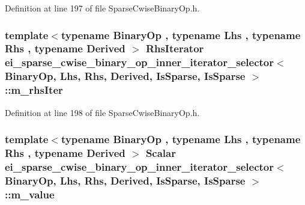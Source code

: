 Definition at line 197 of file Sparse\-Cwise\-Binary\-Op.\-h.

\hypertarget{classei__sparse__cwise__binary__op__inner__iterator__selector_3_01_binary_op_00_01_lhs_00_01_rhs41884b18ee8e06a3d784c3c098ec6b91_a04c14eedbcb446aadbc695ba362b4578}{
\subsubsection[{m\-\_\-rhs\-Iter}]{\setlength{\rightskip}{0pt plus 5cm}template$<$typename Binary\-Op , typename Lhs , typename Rhs , typename Derived $>$ Rhs\-Iterator {\bf ei\-\_\-sparse\-\_\-cwise\-\_\-binary\-\_\-op\-\_\-inner\-\_\-iterator\-\_\-selector}$<$ Binary\-Op, Lhs, Rhs, Derived, {\bf Is\-Sparse}, {\bf Is\-Sparse} $>$\-::m\-\_\-rhs\-Iter\hspace{0.3cm}{\ttfamily [protected]}}}\label{classei__sparse__cwise__binary__op__inner__iterator__selector_3_01_binary_op_00_01_lhs_00_01_rhs41884b18ee8e06a3d784c3c098ec6b91_a04c14eedbcb446aadbc695ba362b4578}


Definition at line 198 of file Sparse\-Cwise\-Binary\-Op.\-h.

\hypertarget{classei__sparse__cwise__binary__op__inner__iterator__selector_3_01_binary_op_00_01_lhs_00_01_rhs41884b18ee8e06a3d784c3c098ec6b91_a7692a3373b8de4be09166b217fb1a8c1}{
\subsubsection[{m\-\_\-value}]{\setlength{\rightskip}{0pt plus 5cm}template$<$typename Binary\-Op , typename Lhs , typename Rhs , typename Derived $>$ Scalar {\bf ei\-\_\-sparse\-\_\-cwise\-\_\-binary\-\_\-op\-\_\-inner\-\_\-iterator\-\_\-selector}$<$ Binary\-Op, Lhs, Rhs, Derived, {\bf Is\-Sparse}, {\bf Is\-Sparse} $>$\-::m\-\_\-value\hspace{0.3cm}{\ttfamily [protected]}}}\label{classei__sparse__cwise__binary__op__inner__iterator__selector_3_01_binary_op_00_01_lhs_00_01_rhs41884b18ee8e06a3d784c3c098ec6b91_a7692a3373b8de4be09166b217fb1a8c1}


